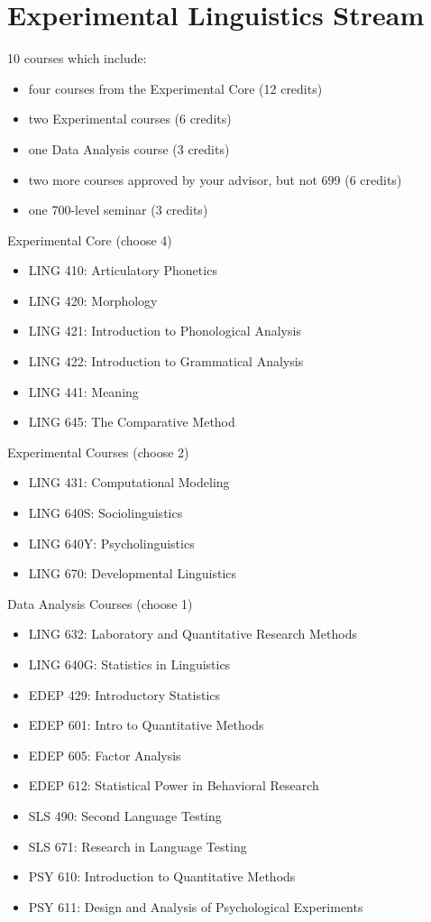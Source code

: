 \documentclass[
]{book}
\providecommand{\tightlist}{%
  \setlength{\itemsep}{0pt}\setlength{\parskip}{0pt}}
\begin{document}
\section{Experimental Linguistics Stream}\label{experimental-linguistics-stream}

10 courses which include:

\begin{itemize}
\tightlist
\item
  four courses from the Experimental Core (12 credits)
\item
  two Experimental courses (6 credits)
\item
  one Data Analysis course (3 credits)
\item
  two more courses approved by your advisor, but not 699 (6 credits)
\item
  one 700-level seminar (3 credits)
\end{itemize}

Experimental Core (choose 4)

\begin{itemize}
\tightlist
\item
  LING 410: Articulatory Phonetics
\item
  LING 420: Morphology
\item
  LING 421: Introduction to Phonological Analysis
\item
  LING 422: Introduction to Grammatical Analysis
\item
  LING 441: Meaning
\item
  LING 645: The Comparative Method
\end{itemize}

Experimental Courses (choose 2)

\begin{itemize}
\tightlist
\item
  LING 431: Computational Modeling
\item
  LING 640S: Sociolinguistics
\item
  LING 640Y: Psycholinguistics
\item
  LING 670: Developmental Linguistics
\end{itemize}

Data Analysis Courses (choose 1)

\begin{itemize}
\tightlist
\item
  LING 632: Laboratory and Quantitative Research Methods
\item
  LING 640G: Statistics in Linguistics
\item
  EDEP 429: Introductory Statistics
\item
  EDEP 601: Intro to Quantitative Methods
\item
  EDEP 605: Factor Analysis
\item
  EDEP 612: Statistical Power in Behavioral Research
\item
  SLS 490: Second Language Testing
\item
  SLS 671: Research in Language Testing
\item
  PSY 610: Introduction to Quantitative Methods
\item
  PSY 611: Design and Analysis of Psychological Experiments
\end{itemize}
\end{document}

